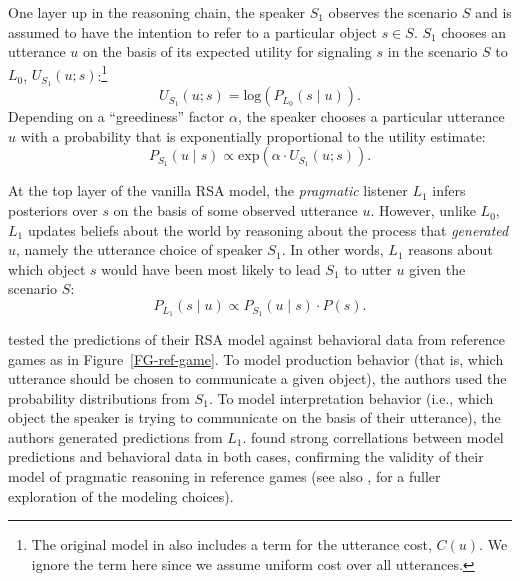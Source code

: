 \documentclass[11pt,a4paper]{article}
\begin{document}
One layer up in the reasoning chain, the speaker $S_1$ observes the scenario $S$ and is assumed to have the intention to refer to a particular object $s \in S$.
$S_1$ chooses an utterance $u$ on the basis of its expected utility for signaling $s$ in the scenario $S$ to $L_0$, $U_{S_1}(u;s)$:\footnote{The original model in  also includes a term for the utterance cost, $C(u)$. We ignore the term here since we assume uniform cost over all utterances.}
\begin{equation}
U_{S_{1}}(u;s) = \textrm{log}(P_{L_{0}}(s \mid u)).
\end{equation}
Depending on a ``greediness'' factor $\alpha$, the speaker chooses a particular utterance $u$ with a probability that is exponentially proportional to the utility estimate: 
\begin{equation}
P_{S_{1}} (u \mid s) \propto   \textrm{exp}(\alpha \cdot U_{S_{1}} (u;s)).
\end{equation}


At the top layer of the vanilla RSA model, the \emph{pragmatic} listener $L_1$ infers posteriors over $s$ on the basis of some observed utterance $u$.
However, unlike $L_0$, $L_1$ updates beliefs about the world by reasoning about the process that \emph{generated} $u$, namely the utterance choice of speaker $S_1$.
In other words, $L_1$ reasons about which object $s$ would have been most likely to lead $S_1$ to utter $u$ given the scenario $S$:
\begin{equation}
P_{L_{1}}(s \mid u) \propto P_{S_{1}}(u \mid s) \cdot P(s).
\end{equation}


 tested the predictions of their RSA model against behavioral data from reference games as in Figure~\ref{FG-ref-game}.
To model production behavior (that is, which utterance should be chosen to communicate a given object), the authors used the probability distributions from $S_1$.
To model interpretation behavior (i.e., which object the speaker is trying to communicate on the basis of their utterance), the authors generated predictions from $L_1$.
\citeauthor{frankgoodman2012} found strong correllations between model predictions and behavioral data in both cases, confirming the validity of their model of pragmatic reasoning in reference games (see also , for a fuller exploration of the modeling choices).
\end{document}
